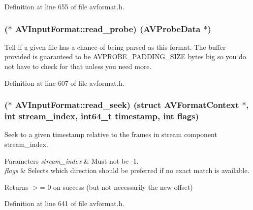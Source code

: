 Definition at line 655 of file avformat.\+h.

\subsubsection[{\texorpdfstring{read\+\_\+probe}{read_probe}}]{($\ast$ A\+V\+Input\+Format\+::read\+\_\+probe) ({\bf A\+V\+Probe\+Data} $\ast$)}\hypertarget{struct_a_v_input_format_a2e272c7785fdd26895b1af1867b62567}{}\label{struct_a_v_input_format_a2e272c7785fdd26895b1af1867b62567}
Tell if a given file has a chance of being parsed as this format. The buffer provided is guaranteed to be A\+V\+P\+R\+O\+B\+E\+\_\+\+P\+A\+D\+D\+I\+N\+G\+\_\+\+S\+I\+ZE bytes big so you do not have to check for that unless you need more. 

Definition at line 607 of file avformat.\+h.

\subsubsection[{\texorpdfstring{read\+\_\+seek}{read_seek}}]{($\ast$ A\+V\+Input\+Format\+::read\+\_\+seek) (struct {\bf A\+V\+Format\+Context} $\ast$, {\bf int} stream\+\_\+index, {\bf int64\+\_\+t} timestamp, {\bf int} {\bf flags})}\hypertarget{struct_a_v_input_format_a04a3b9ba459666bdb43628c472fa29bf}{}\label{struct_a_v_input_format_a04a3b9ba459666bdb43628c472fa29bf}
Seek to a given timestamp relative to the frames in stream component stream\+\_\+index. 
\begin{DoxyParams}{Parameters}
{\em stream\+\_\+index} & Must not be -\/1. \\
\hline
{\em flags} & Selects which direction should be preferred if no exact match is available. \\
\hline
\end{DoxyParams}
\begin{DoxyReturn}{Returns}
$>$= 0 on success (but not necessarily the new offset) 
\end{DoxyReturn}


Definition at line 641 of file avformat.\+h.

